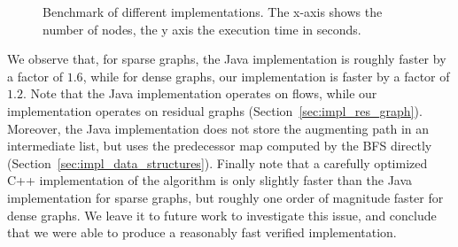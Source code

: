 \documentclass{llncs}
\begin{document}
\begin{figure}[!h]
% 
  
  \caption{Benchmark of different implementations. The x-axis shows the number of nodes, the y axis the execution time in seconds.}\label{fig:benchmark}
  \end{figure}

  We observe that, for sparse graphs, the Java implementation is roughly faster by a factor of $1.6$, while for dense graphs, our implementation is faster by a factor of $1.2$. Note that the Java implementation operates on flows, while our implementation 
  operates on residual graphs (\cf Section~\ref{sec:impl_res_graph}). Moreover, the Java implementation does not store the augmenting 
  path in an intermediate list, but uses the predecessor map computed by the BFS directly (\cf Section~\ref{sec:impl_data_structures}).
  Finally note that a carefully optimized C++ implementation of the algorithm is only slightly faster than the Java implementation for sparse graphs,
  but roughly one order of magnitude faster for dense graphs. We leave it to future work to investigate this issue, and conclude that we were able to produce
  a reasonably fast verified implementation.
  
  
% 
% 
    
\end{document}
